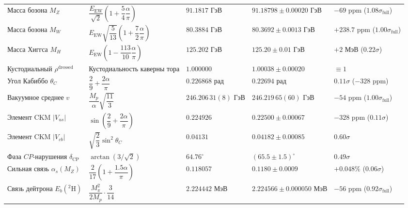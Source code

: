 \documentclass[11pt,a4paper]{article}
\theoremstyle{definition}
\theoremstyle{remark}
\begin{document}
\begin{xltabular}{\textwidth}{
>{\raggedright\arraybackslash}p{3.8cm}
>{\centering\arraybackslash}X
>{\centering\arraybackslash}p{2.7cm}
>{\centering\arraybackslash}p{2.8cm}
>{\centering\arraybackslash}p{2.0cm}
}
Масса бозона $M_Z$ & $\dfrac{E_{\mathrm{EW}}}{\sqrt{2}}\left(1 + \dfrac{5}{4}\dfrac{\alpha}{\pi}\right)$ & $91.1817\text{ ГэВ}$ & $91.18798 \pm 0.00020\text{ ГэВ}$ & $-69\text{ ppm}$ ($1.08\sigma_{\mathrm{full}}$) \\

Масса бозона $M_W$ & $E_{\mathrm{EW}}\sqrt{\dfrac{5}{13}}\left(1 + \dfrac{7}{2}\dfrac{\alpha}{\pi}\right)$ & $80.3884\text{ ГэВ}$ & $80.3692 \pm 0.0013\text{ ГэВ}$ & $+238.7\text{ ppm}$ ($1.00\sigma_{\mathrm{full}}$) \\


Масса Хиггса $M_H$ & $E_{\mathrm{EW}}\left(1 - \dfrac{113}{10}\dfrac{\alpha}{\pi}\right)$ & $125.202\text{ ГэВ}$ & $125.20 \pm 0.01\text{ ГэВ}$ & $+2\text{ МэВ}$ ($0.22\sigma$) \\

Кустодиальный $\rho^{\mathrm{dressed}}$ & Кустодиальность каверны тора & $1.000000$ & $1.00038 \pm 0.00020$ &  $\equiv 1$ \\

Угол Кабиббо $\theta_C$ & $\dfrac{2}{9} + \dfrac{2\alpha}{\pi}$ & $0.226868\text{ рад}$ & $0.22694\text{ рад}$ & $0.11\sigma$ ($-328\text{ ppm}$) \\

Вакуумное среднее $v$ & $\dfrac{M_p}{\alpha}\sqrt{\dfrac{11}{3}}$ & $246.206\,31(8)\text{ ГэВ}$ & $246.219\,65(60)\text{ ГэВ}$ & $-54\text{ ppm}$ ($1.00\sigma_{\mathrm{full}}$) \\

Элемент CKM $|V_{us}|$ & $\sin\left(\dfrac{2}{9} + \dfrac{2\alpha}{\pi}\right)$ & $0.224926$ & $0.22500 \pm 0.00067$ & $-328\text{ ppm}$ ($0.11\sigma$) \\

Элемент CKM $|V_{cb}|$ & $\sqrt{\dfrac{2}{3}} \sin^2\theta_C$ & $0.04131$ & $0.04182 \pm 0.00085$ & $0.60\sigma$ \\

Фаза $CP$-нарушения $\delta_{\mathrm{CP}}$ & $\arctan(3 / \sqrt{2})$ & $64.76^\circ$ & $(65.5 \pm 1.5)^\circ$ & $0.49\sigma$ \\

Сильная связь $\alpha_s(M_Z)$ & $\dfrac{2}{17}\left(1 + \dfrac{1.5\alpha}{\pi}\right)$ & $0.118057$ & $0.1180 \pm 0.0009$ & $+0.048\%$ ($0.06\sigma$) \\

Связь дейтрона $E_b(^2\mathrm{H})$ & $\dfrac{M_\pi^2}{2 M_p} \cdot \dfrac{3}{14}$ & $2.224442\text{ МэВ}$ & $2.224566 \pm 0.000050\text{ МэВ}$ & $-56\text{ ppm}$ ($0.92\sigma_{\mathrm{full}}$) \\


\end{xltabular}
\end{document}
